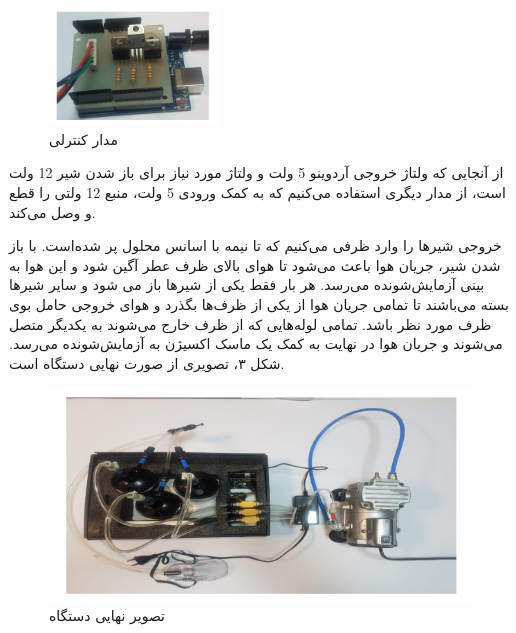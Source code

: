 \documentclass[oneside]{report}
\begin{document}
\begin{figure}[h]
	\centering
	\includegraphics[width=0.4\textwidth]{arduino.png}
	\caption{مدار کنترلی}
	\label{fig:sche1}
\end{figure}


از آنجایی که ولتاژ خروجی آردوینو 5 ولت و ولتاژ مورد نیاز برای باز شدن شیر 12 ولت است، از مدار دیگری استفاده می‌کنیم که به کمک ورودی 5 ولت، منبع 12 ولتی را قطع و وصل می‌کند.


خروجی شیرها را وارد ظرفی می‌کنیم که تا نیمه با اسانس محلول پر شده‌است. با باز شدن شیر، جریان هوا باعث می‌شود تا هوای بالای ظرف عطر آگین شود و این هوا به بینی آزمایش‌شونده می‌رسد.
هر بار فقط یکی از شیرها باز می شود و سایر شیرها بسته می‌باشند تا تمامی جریان هوا از یکی از ظرف‌ها بگذرد و هوای خروجی حامل بوی ظرف مورد نظر باشد. تمامی لوله‌هایی که از ظرف خارج می‌شوند به یکدیگر متصل می‌شوند و جریان هوا در نهایت به کمک یک ماسک اکسیژن به آزمایش‌شونده می‌رسد.
شکل ۳، تصویری از صورت نهایی دستگاه است.
\begin{figure}[h]
	\centering
	\includegraphics[width=1\textwidth]{full.png}
	\caption{تصویر نهایی دستگاه}
	\label{fig:sche1}
\end{figure}
\end{document}
